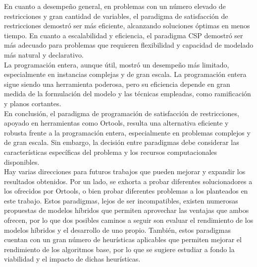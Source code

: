 \documentclass[12pt]{report}
\begin{document}
En cuanto a desempeño general, en problemas con un número elevado de restricciones y gran cantidad de variables, el paradigma de satisfacción de restricciones demostró ser más eficiente, alcanzando soluciones óptimas en menos tiempo. En cuanto a escalabilidad y eficiencia, el paradigma CSP demostró ser más adecuado para problemas que requieren flexibilidad y capacidad de modelado más natural y declarativo. \\

La programación entera, aunque útil, mostró un desempeño más limitado, especialmente en instancias complejas y de gran escala. La programación entera sigue siendo una herramienta poderosa, pero su eficiencia depende en gran medida de la formulación del modelo y las técnicas empleadas, como ramificación y planos cortantes.\\

En conclusión, el paradigma de programación de satisfacción de restricciones, apoyado en herramientas como Ortools, resulta una alternativa eficiente y robusta frente a la programación entera, especialmente en problemas complejos y de gran escala. Sin embargo, la decisión entre paradigmas debe considerar las características específicas del problema y los recursos computacionales disponibles.\\

Hay varias direcciones para futuros trabajos que pueden mejorar y expandir los resultados obtenidos. Por un lado, se exhorta a probar diferentes solucionadores a los ofrecidos por Ortools, o bien probar diferentes problemas a los planteados en este trabajo. Estos paradigmas, lejos de ser incompatibles, existen numerosas propuestas de modelos híbridos que permiten aprovechar las ventajas que ambos ofrecen, por lo que dos posibles caminos a seguir son evaluar el rendimiento de los modelos híbridos y el desarrollo de uno propio. También, estos paradigmas cuentan con un gran número de heurísticas aplicables que permiten mejorar el rendimiento de los algoritmos base, por lo que se sugiere estudiar a fondo la viabilidad y el impacto de dichas heurísticas.

% 
% 
\end{document}
